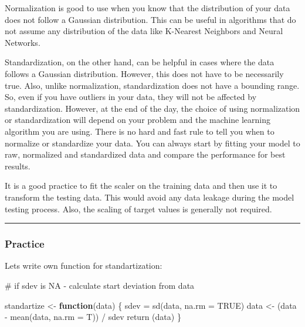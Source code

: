 \documentclass[
  letterpaper,
  DIV=11,
  numbers=noendperiod]{scrreprt}
\newenvironment{Shaded}{\begin{snugshade}}{\end{snugshade}}
\newcommand{\AttributeTok}[1]{\textcolor[rgb]{0.40,0.45,0.13}{#1}}
\newcommand{\CommentTok}[1]{\textcolor[rgb]{0.37,0.37,0.37}{#1}}
\newcommand{\ConstantTok}[1]{\textcolor[rgb]{0.56,0.35,0.01}{#1}}
\newcommand{\ControlFlowTok}[1]{\textcolor[rgb]{0.00,0.23,0.31}{\textbf{#1}}}
\newcommand{\FunctionTok}[1]{\textcolor[rgb]{0.28,0.35,0.67}{#1}}
\newcommand{\NormalTok}[1]{\textcolor[rgb]{0.00,0.23,0.31}{#1}}
\newcommand{\OtherTok}[1]{\textcolor[rgb]{0.00,0.23,0.31}{#1}}
\newcommand{\SpecialCharTok}[1]{\textcolor[rgb]{0.37,0.37,0.37}{#1}}
\begin{document}
Normalization is good to use when you know that the distribution of your
data does not follow a Gaussian distribution. This can be useful in
algorithms that do not assume any distribution of the data like
K-Nearest Neighbors and Neural Networks.

Standardization, on the other hand, can be helpful in cases where the
data follows a Gaussian distribution. However, this does not have to be
necessarily true. Also, unlike normalization, standardization does not
have a bounding range. So, even if you have outliers in your data, they
will not be affected by standardization. However, at the end of the day,
the choice of using normalization or standardization will depend on your
problem and the machine learning algorithm you are using. There is no
hard and fast rule to tell you when to normalize or standardize your
data. You can always start by fitting your model to raw, normalized and
standardized data and compare the performance for best results.

It is a good practice to fit the scaler on the training data and then
use it to transform the testing data. This would avoid any data leakage
during the model testing process. Also, the scaling of target values is
generally not required.

\begin{center}\rule{0.5\linewidth}{0.5pt}\end{center}

\subsubsection{Practice}\label{practice-1}

Lets write own function for standartization:

\begin{Shaded}
\begin{Highlighting}[]
\CommentTok{\# if sdev is NA {-} calculate start deviation from data}

\NormalTok{standartize }\OtherTok{\textless{}{-}} \ControlFlowTok{function}\NormalTok{(data) \{    }
\NormalTok{    sdev }\OtherTok{=} \FunctionTok{sd}\NormalTok{(data, }\AttributeTok{na.rm =} \ConstantTok{TRUE}\NormalTok{)  }
\NormalTok{    data }\OtherTok{\textless{}{-}}\NormalTok{ (data }\SpecialCharTok{{-}} \FunctionTok{mean}\NormalTok{(data, }\AttributeTok{na.rm =}\NormalTok{ T)) }\SpecialCharTok{/}\NormalTok{ sdev}
    \FunctionTok{return}\NormalTok{ (data)    }
\NormalTok{\}}
\end{Highlighting}
\end{Shaded}
\end{document}
